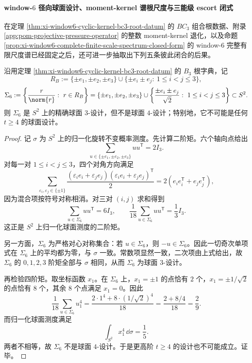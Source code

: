 \paragraph{window-\texorpdfstring{$6$}{6} 径向球面设计、moment-kernel 谱根尺度与三能级 escort 闭式}
在定理 \ref{thm:xi-window6-cyclic-kernel-bc3-root-datum} 的 \(BC_3\) 组合根数据、附录 \ref{app:pom-projective-pressure-operator} 的整数 moment-kernel 退化，以及命题 \ref{prop:xi-window6-complete-finite-scale-spectrum-closed-form} 的 window-\(6\) 完整有限尺度谱已经固定之后，还可进一步抽取出下列五条彼此闭合的后果。

\begin{theorem}\label{thm:xi-time-part9r-window6-radial-spherical-3design}
沿用定理 \ref{thm:xi-window6-cyclic-kernel-bc3-root-datum} 的 \(B_3\) 根字典，记
\[
R_B:=
\{\pm e_1,\pm e_2,\pm e_3\}
\cup
\{\pm e_i\pm e_j:\ 1\le i<j\le 3\},
\]
\[
\Sigma_6:=
\left\{
\frac{r}{\norm{r}}:\ r\in R_B
\right\}
=
\{\pm e_1,\pm e_2,\pm e_3\}
\cup
\left\{
\frac{\pm e_i\pm e_j}{\sqrt2}:\ 1\le i<j\le 3
\right\}
\subset S^2.
\]
则 \(\Sigma_6\) 是 \(S^2\) 上的精确球面 \(3\)-设计，但不是球面 \(4\)-设计；特别地，它不可能是任何 \(t\ge 4\) 的球面设计。
\end{theorem}
\begin{proof}
记 \(\sigma\) 为 \(S^2\) 上的归一化旋转不变概率测度。先计算二阶矩。六个轴向点给出
\[
\sum_{u\in\{\pm e_1,\pm e_2,\pm e_3\}}uu^{\mathsf T}=2I_3.
\]
对每一对 \(1\le i<j\le 3\)，四个对角方向满足
\[
\sum_{\varepsilon_i,\varepsilon_j\in\{\pm1\}}
\frac{(\varepsilon_i e_i+\varepsilon_j e_j)(\varepsilon_i e_i+\varepsilon_j e_j)^{\mathsf T}}{2}
=
2(e_ie_i^{\mathsf T}+e_je_j^{\mathsf T}),
\]
因为混合项按符号对称相消。对三对 \((i,j)\) 求和得到
\[
\sum_{u\in\Sigma_6}uu^{\mathsf T}=6I_3,
\qquad
\frac1{18}\sum_{u\in\Sigma_6}uu^{\mathsf T}=\frac13 I_3.
\]
这正是 \(S^2\) 上归一化球面测度的二阶矩。

另一方面，\(\Sigma_6\) 为严格对心对称集合：若 \(u\in\Sigma_6\)，则 \(-u\in\Sigma_6\)。因此一切奇次单项式在 \(\Sigma_6\) 上的平均都为零，与 \(\sigma\) 一致。常数项显然一致，二次项由上式给出，故 \(\Sigma_6\) 的 \(0,1,2,3\) 阶矩全部与 \(\sigma\) 相同，从而 \(\Sigma_6\) 为球面 \(3\)-设计。

再检验四阶矩。取坐标函数 \(x_1\)。在 \(\Sigma_6\) 上，\(x_1=\pm 1\) 的点恰有 \(2\) 个，\(x_1=\pm 1/\sqrt2\) 的点恰有 \(8\) 个，其余 \(8\) 个点满足 \(x_1=0\)。因此
\[
\frac1{18}\sum_{u\in\Sigma_6}u_1^4
=
\frac{2\cdot 1^4+8\cdot (1/\sqrt2)^4}{18}
=
\frac{2+8/4}{18}
=
\frac29.
\]
而归一化球面测度满足
\[
\int_{S^2}x_1^4\,\dd\sigma=\frac15.
\]
两者不相等，故 \(\Sigma_6\) 不是球面 \(4\)-设计。于是更高阶 \(t\ge 4\) 的设计也不可能成立。证毕。
\end{proof}

